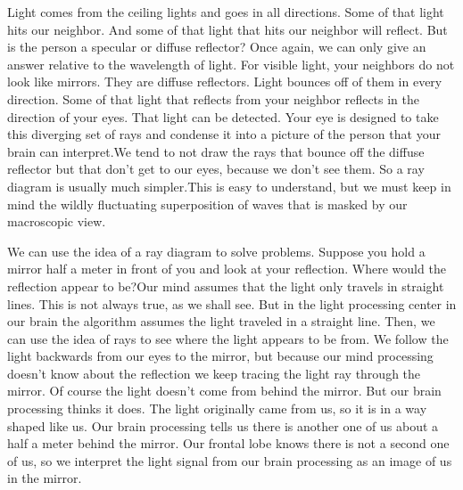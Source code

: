 \documentclass{article}
\begin{document}
Light comes from the ceiling lights and goes in all directions. Some of that
light hits our neighbor. And some of that light that hits our neighbor will
reflect. But is the person a specular or diffuse reflector? Once again, we
can only give an answer relative to the wavelength of light. For visible
light, your neighbors do not look like mirrors. They are diffuse reflectors.
Light bounces off of them in every direction. Some of that light that
reflects from your neighbor reflects in the direction of your eyes. That
light can be detected. Your eye is designed to take this diverging set of
rays and condense it into a picture of the person that your brain can
interpret.We tend to not draw the rays that
bounce off the diffuse reflector but that don't get to our eyes, because we
don't see them. So a ray diagram is usually much simpler.This is easy to understand, but
we must keep in mind the wildly fluctuating superposition of waves that is
masked by our macroscopic view.

We can use the idea of a ray diagram to solve problems. Suppose you hold a
mirror half a meter in front of you and look at your reflection. Where would
the reflection appear to be?Our mind assumes that the light
only travels in straight lines. This is not always true, as we shall see.
But in the light processing center in our brain the algorithm assumes the
light traveled in a straight line. Then, we can use the idea of rays to see
where the light appears to be from. We follow the light backwards from our
eyes to the mirror, but because our mind processing doesn't know about the
reflection we keep tracing the light ray through the mirror. Of course the
light doesn't come from behind the mirror. But our brain processing thinks
it does. The light originally came from us, so it is in a way shaped like
us. Our brain processing tells us there is another one of us about a half a
meter behind the mirror. Our frontal lobe knows there is not a second one of
us, so we interpret the light signal from our brain processing as an image
of us in the mirror.
\end{document}

